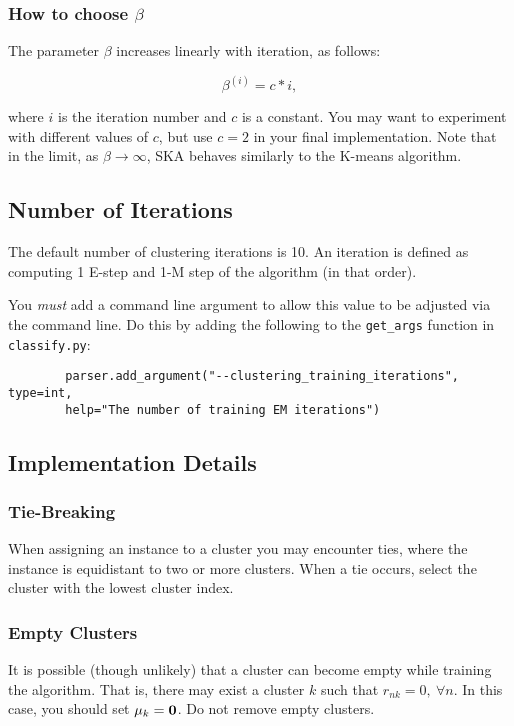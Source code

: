 \documentclass[11pt]{article}
\newcommand{\vmuk}{{\bf \mu}_k}
\newcommand{\code}[1]{{\footnotesize \tt #1}}
\begin{document}
\subsubsection { How to choose $\beta$}
The parameter $\beta$ increases linearly with iteration, as follows:

\begin{equation}
\beta^{(i)} = c*i,
\end{equation}

\noindent where $i$ is the iteration number and $c$ is a constant. You may want to experiment with different values of $c$, but use $c = 2$ in your final implementation.  Note that in the limit, as $\beta \rightarrow  \infty$, SKA behaves similarly to the K-means algorithm.

\subsection{Number of Iterations}
\label{sec:iterations}

The default number of clustering iterations is 10. An iteration is defined as computing 1 E-step and 1-M step of the algorithm (in that order).

You \emph{must} add a command line argument to allow this value to be adjusted via the command line.  Do this by
adding the following to the \code{get\_args} function in \code{classify.py}:
	\begin{footnotesize}
		\begin{verbatim}
		parser.add_argument("--clustering_training_iterations", type=int, 
		help="The number of training EM iterations")
		\end{verbatim}
	\end{footnotesize}
	
\subsection{Implementation Details}

\subsubsection{Tie-Breaking}
When assigning an instance to a cluster you may encounter ties, where the instance is equidistant to two or more clusters. When a tie occurs, select the cluster with the lowest cluster index.

\subsubsection{Empty Clusters}
It is possible (though unlikely) that a cluster can become empty while training the algorithm. That is, there may exist a cluster $k$ such that $r_{nk}=0,\ \forall n$. In this case, you should set $\vmuk={\mathbf 0}$. Do not remove empty clusters.
\end{document}
